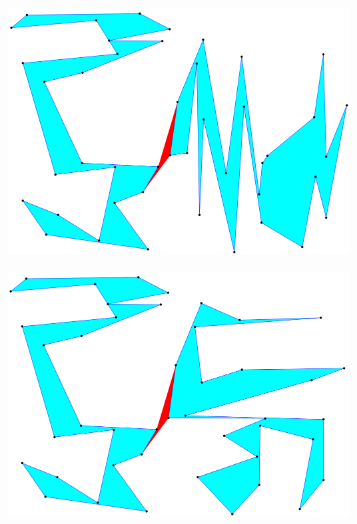 \documentclass[conference]{IEEEtran}
\begin{document}
\begin{figure}[htbp]
				\begin{subfigure}{0.45\linewidth}
					\centering
					\includegraphics[width=0.99\textwidth]{fig1c.png}
					\caption{}
					\label{fig1c}
				\end{subfigure}
				\begin{subfigure}{0.45\linewidth}
					\centering
					\includegraphics[width=0.99\textwidth]{fig1d.png}
					\caption{}
					\label{fig1d}
				\end{subfigure}
				

\end{figure}
\end{document}
